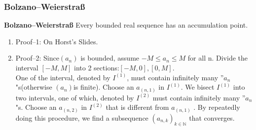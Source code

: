 \documentclass{beamer}
\begin{document}
\begin{frame}
    \frametitle{Bolzano--Weierstraß}
    \textbf{Bolzano--Weierstraß} Every bounded real sequence has an accumulation point.
    \begin{enumerate}
        \item Proof--1: On Horst's Slides.
        \item Proof--2:
              Since$(a_n)$ is bounded, assume $-M\leq a_n\leq M$ for all n. Divide the interval $[-M,M]$ into 2 sections:$[-M,0],[0,M]$.\\
              One of the interval, denoted by $I^{(1)}$, must contain infinitely many ''$a_n$"s(otherwise $(a_n)$is finite). Choose an $a_{(n,1)}$
              in $I^{(1)}$. We bisect $I^{(1)}$ into two intervals, one of which, denoted by $I^{(2)}$ must contain
              infinitely many ''$a_n$ "s. Choose an $a_{(n,2)}$ in $I^{(2)}$ that is different from $a_{(n,1)}$ . By
              repeatedly doing this procedure, we find a subsequence $(a_{n,k})_{k\in\mathbb{N}}$ that converges.
    \end{enumerate}
\end{frame}
\end{document}
